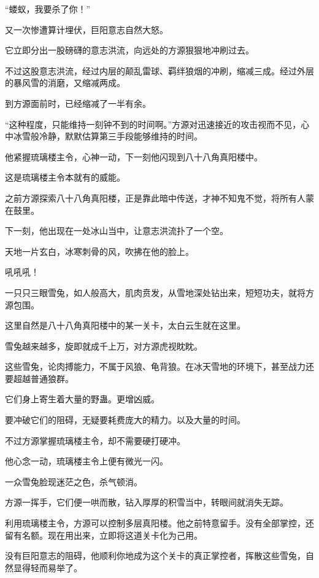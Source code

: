 
\begin{this_body}



“蝼蚁，我要杀了你！”

又一次惨遭算计埋伏，巨阳意志自然大怒。

它立即分出一股磅礴的意志洪流，向远处的方源狠狠地冲刷过去。

不过这股意志洪流，经过内层的颠乱雷球、羁绊狼烟的冲刷，缩减三成。经过外层的暴风雪的消磨，又缩减两成。

到方源面前时，已经缩减了一半有余。

“这种程度，只能维持一刻钟不到的时间啊。”方源对迅速接近的攻击视而不见，心中冰雪般冷静，默默估算第三手段能够维持的时间。

他紧握琉璃楼主令，心神一动，下一刻他闪现到八十八角真阳楼中。

这是琉璃楼主令本就有的威能。

之前方源探索八十八角真阳楼，正是靠此暗中传送，才神不知鬼不觉，将所有人蒙在鼓里。

下一刻，他出现在一处冰山当中，让意志洪流扑了一个空。

天地一片玄白，冰寒刺骨的风，吹拂在他的脸上。

吼吼吼！

一只只三眼雪兔，如人般高大，肌肉贲发，从雪地深处钻出来，短短功夫，就将方源包围。

这里自然是八十八角真阳楼中的某一关卡，太白云生就在这里。

雪兔越来越多，旋即就成千上万，对方源虎视眈眈。

这些雪兔，论肉搏能力，不属于风狼、龟背狼。在冰天雪地的环境下，甚至战力还要超越普通狼群。

它们身上寄生着大量的野蛊。更增凶威。

要冲破它们的阻碍，无疑要耗费庞大的精力。以及大量的时间。

不过方源掌握琉璃楼主令，却不需要硬打硬冲。

他心念一动，琉璃楼主令上便有微光一闪。

一众雪兔脸现迷茫之色，杀气顿消。

方源一挥手，它们便一哄而散，钻入厚厚的积雪当中，转眼间就消失无踪。

利用琉璃楼主令，方源可以控制多层真阳楼。他之前特意留手。没有全部掌控，还留有名额。现在用出来，立即将这道关卡化为己用。

没有巨阳意志的阻碍，他顺利你地成为这个关卡的真正掌控者，挥散这些雪兔，自然显得轻而易举了。


\end{this_body}
